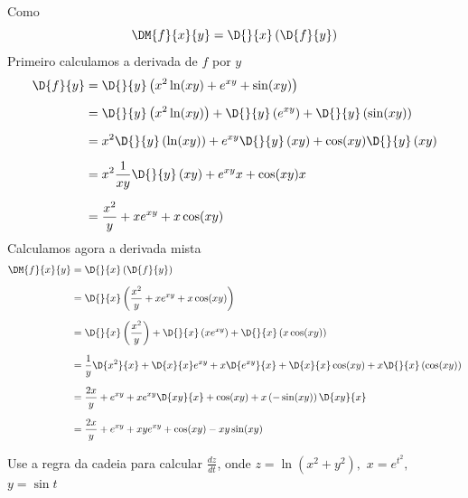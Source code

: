 \documentclass[a4paper,12pt,fleqn]{article}
\begin{document}
\begin{answer}
  Como
  \[
    \DM{f}{x}{y} = \D{}{x} \left(\D{f}{y}\right)
  \]
  Primeiro calculamos a derivada de $f$ por $y$
  \begin{align*}
    \D{f}{y}
    & = \D{}{y} \left( x^2 \ln(xy) + e^{xy} + \sin(xy) \right)
    \\[2mm]
    & = \D{}{y} \left( x^2 \ln(xy) \right)
      + \D{}{y} \left( e^{xy} \right)
      + \D{}{y} \left( \sin(xy) \right)
    \\[2mm]
    & = x^2 \D{}{y} \left( \ln(xy) \right)
      + e^{xy} \D{}{y} \left( xy \right)
      + \cos(xy) \D{}{y} \left( xy \right)
    \\[2mm]
    & = x^2 \frac{1}{xy} \D{}{y} \left(xy\right)
      + e^{xy} x
      + \cos(xy) x
    \\[2mm]
    & = \frac{x^2}{y} + xe^{xy} + x\cos(xy)
  \end{align*}
  Calculamos agora a derivada mista
  \begin{align*}
    \DM{f}{x}{y}
    & = \D{}{x} \left(\D{f}{y}\right)
    \\[2mm]
    & = \D{}{x} \left( \frac{x^2}{y} + xe^{xy} + x\cos(xy) \right)
    \\[2mm]
    & = \D{}{x} \left( \frac{x^2}{y} \right)
      + \D{}{x} \left( xe^{xy} \right)
      + \D{}{x} \left( x\cos(xy) \right)
    \\[2mm]
    & = \frac{1}{y} \D{x^2}{x}
      + \D{x}{x} e^{xy}
      + x \D{e^{xy}}{x}
      + \D{x}{x} \cos(xy)
      + x\D{}{x} \left( \cos(xy) \right)
    \\[2mm]
    & = \frac{2x}{y}
      + e^{xy}
      + x e^{xy}  \D{xy}{x}
      + \cos(xy)
      + x\left(-\sin(xy)\right)\D{xy}{x}
    \\[2mm]
    & = \frac{2x}{y}
      + e^{xy}
      + xy e^{xy}
      + \cos(xy)
      - xy\sin(xy)
  \end{align*}
\end{answer}

Use a regra da cadeia para calcular $\frac{dz}{dt}$, onde
\(
  z = \ln\left(x^2 + y^2\right),
\)
\(
  x = e^{t^2},
\)
\(
 y = \sin t
\)
\end{document}
